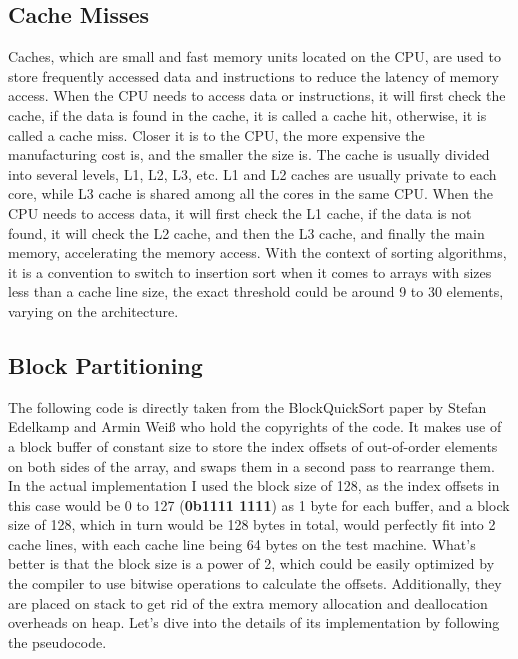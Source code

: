 \documentclass{article}
\begin{document}
\subsection{Cache Misses}
Caches, which are small and fast memory units located on the CPU, are used to store frequently accessed data and instructions to reduce the latency of memory access.
When the CPU needs to access data or instructions, it will first check the cache, if the data is found in the cache, it is called a cache hit, otherwise, it is called a cache miss.
Closer it is to the CPU, the more expensive the manufacturing cost is, and the smaller the size is. The cache is usually divided into several levels, L1, L2, L3, etc.
L1 and L2 caches are usually private to each core, while L3 cache is shared among all the cores in the same CPU.
When the CPU needs to access data, it will first check the L1 cache, if the data is not found, it will check the L2 cache, and then the L3 cache, and finally the main memory, accelerating the memory access.
With the context of sorting algorithms, it is a convention to switch to insertion sort when it comes to arrays with sizes less than a cache line size, the exact threshold could be around 9 to 30 elements, varying on the architecture.

\subsection{Block Partitioning}
The following code is directly taken from the BlockQuickSort paper by Stefan Edelkamp and Armin Weiß \cite{BlockQuickSort} who hold the copyrights of the code.
It makes use of a block buffer of constant size to store the index offsets of out-of-order elements on both sides of the array, and swaps them in a second pass to rearrange them.
In the actual implementation I used the block size of 128, as the index offsets in this case would be 0 to 127 (\textbf{0b1111 1111}) as 1 byte for each buffer,
and a block size of 128, which in turn would be 128 bytes in total, would perfectly fit into 2 cache lines, with each cache line being 64 bytes on the test machine.
What's better is that the block size is a power of 2, which could be easily optimized by the compiler to use bitwise operations to calculate the offsets.
Additionally, they are placed on stack to get rid of the extra memory allocation and deallocation overheads on heap. Let's dive into the details of its implementation by following the pseudocode.
\end{document}
